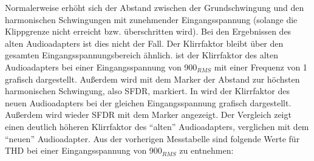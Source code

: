 
Normalerweise erhöht sich der Abstand zwischen der Grundschwingung und den harmonischen Schwingungen mit zunehmender Eingangsspannung (solange die Klippgrenze nicht erreicht bzw. überschritten wird). Bei den Ergebnissen des alten Audioadapters ist dies nicht der Fall. Der Klirrfaktor bleibt über den gesamten Eingangsspannungsbereich ähnlich.  ist der Klirrfaktor des alten Audioadapters bei einer Eingangsspannung von \unit{900}{\milli\volt}$_{RMS}$ mit einer Frequenz von \unit{1}{\kilo\hertz} grafisch dargestellt. Außerdem wird mit dem Marker der Abstand zur höchsten harmonischen Schwingung, also SFDR, markiert. In  wird der Klirrfaktor des neuen Audioadapters bei der gleichen Eingangsspannung grafisch dargestellt. Außerdem wird wieder SFDR mit dem Marker angezeigt. Der Vergleich zeigt einen deutlich höheren Klirrfaktor des \enquote{alten} Audioadapters, verglichen mit dem \enquote{neuen} Audioadapter. Aus der vorherigen Messtabelle sind folgende Werte für THD bei einer Eingangsspannung von \unit{900}{\milli\volt}$_{RMS}$ zu entnehmen:


